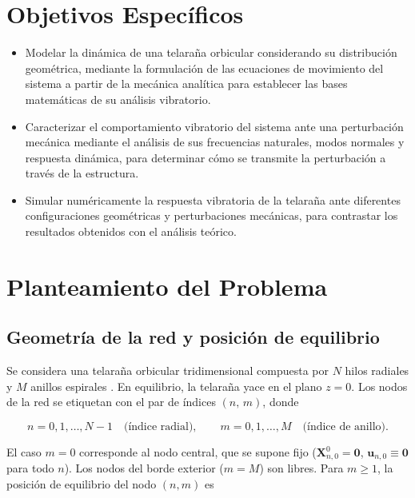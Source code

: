 \documentclass[11pt,letterpaper]{article}
\begin{document}
\section{Objetivos Específicos}
\begin{itemize}
    \item Modelar la dinámica de una telaraña orbicular considerando su distribución geométrica, mediante la formulación de las ecuaciones de movimiento del sistema a partir de la mecánica analítica para establecer las bases matemáticas de su análisis vibratorio.

    \item Caracterizar el comportamiento vibratorio del sistema ante una perturbación mecánica mediante el análisis de sus frecuencias naturales, modos normales y respuesta dinámica, para determinar cómo se transmite la perturbación a través de la estructura.

    \item Simular numéricamente la respuesta vibratoria de la telaraña ante diferentes configuraciones geométricas y perturbaciones mecánicas, para contrastar los resultados obtenidos con el análisis teórico.
\end{itemize}

\section{Planteamiento del Problema}

 

\subsection{Geometría de la red y posición de equilibrio}

Se considera una telaraña orbicular tridimensional compuesta por $N$ hilos
radiales y $M$ anillos espirales \cite{aoyanagi2010,lott2022}. En equilibrio,
la telaraña yace en el plano $z=0$. Los nodos de la red se etiquetan con el
par de índices $(n,\,m)$, donde

\begin{equation}
    n = 0, 1, \dots, N-1 \quad \text{(índice radial)}, \qquad
    m = 0, 1, \dots, M \quad \text{(índice de anillo)}.
\end{equation}

El caso $m = 0$ corresponde al nodo central, que se supone fijo
($\mathbf{X}^0_{n,0} = \mathbf{0}$,
$\mathbf{u}_{n,0} \equiv \mathbf{0}$ para todo $n$). Los nodos del borde
exterior ($m = M$) son libres. Para $m \geq 1$, la posición de equilibrio
del nodo $(n,m)$ es
\end{document}
